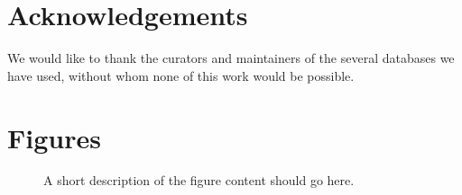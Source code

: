 \documentclass{bmcart}
\begin{document}
\begin{backmatter}
\section*{Acknowledgements}
We would like to thank the curators and maintainers of the several databases we have used, without whom none of this work would be possible.






\section*{Figures}
  \begin{figure}[h!]
  \caption{
      A short description of the figure content
      should go here.}
      \end{figure}


\end{backmatter}
\end{document}
